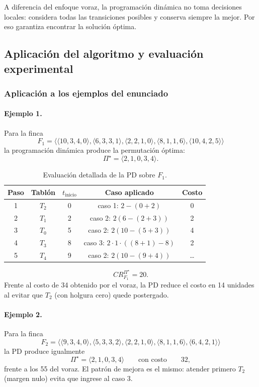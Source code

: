 \documentclass[12pt,a4paper]{article}
\begin{document}
A diferencia del enfoque voraz, la programaci\'on din\'amica no toma decisiones locales: considera todas las transiciones posibles y conserva siempre la mejor. Por eso garantiza encontrar la soluci\'on \'optima.

\subsection{Aplicaci\'on del algoritmo y evaluaci\'on experimental}

\subsubsection{Aplicaci\'on a los ejemplos del enunciado}

\paragraph{Ejemplo 1.}
Para la finca
\[
F_1=\langle\langle 10,3,4,0\rangle,\langle 6,3,3,1\rangle,\langle 2,2,1,0\rangle,\langle 8,1,1,6\rangle,\langle 10,4,2,5\rangle\rangle
\]
la programaci\'on din\'amica produce la permutaci\'on \'optima:
\[
\Pi^\star=\langle 2,1,0,3,4\rangle.
\]

\begin{table}[ht]
  \centering
  \small
  \begin{tabular}{ccccc}
    \toprule
    Paso & Tabl\'on & \(t_{\text{inicio}}\) & Caso aplicado & Costo \\
    \midrule
    1 & \(T_2\) & 0 & caso 1: \(2-(0+2)\) & 0 \\
    2 & \(T_1\) & 2 & caso 2: \(2(6-(2+3))\) & 2 \\
    3 & \(T_0\) & 5 & caso 2: \(2(10-(5+3))\) & 4 \\
    4 & \(T_3\) & 8 & caso 3: \(2\cdot1\cdot((8+1)-8)\) & 2 \\
    5 & \(T_4\) & 9 & caso 2: \(2(10-(9+4))\) & \ldots \\
    \bottomrule
  \end{tabular}
  \caption{Evaluaci\'on detallada de la PD sobre \(F_1\).}
\end{table}

\[
CR_{F_1}^{\Pi^\star}=20.
\]
Frente al costo de 34 obtenido por el voraz, la PD reduce el costo en 14 unidades al evitar que \(T_2\) (con holgura cero) quede postergado.

\paragraph{Ejemplo 2.}
Para la finca
\[
F_2=\langle\langle 9,3,4,0\rangle,\langle 5,3,3,2\rangle,\langle 2,2,1,0\rangle,\langle 8,1,1,6\rangle,\langle 6,4,2,1\rangle\rangle
\]
la PD produce igualmente
\[
\Pi^\star=\langle 2,1,0,3,4\rangle
\qquad\text{con costo}\qquad
32,
\]
frente a los 55 del voraz. El patr\'on de mejora es el mismo: atender primero \(T_2\) (margen nulo) evita que ingrese al caso 3.
\end{document}
